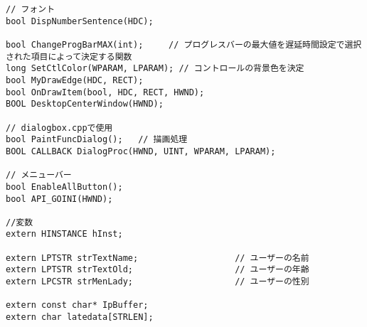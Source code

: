 \begin{lstlisting}[caption=main.h]
// フォント
bool DispNumberSentence(HDC);

bool ChangeProgBarMAX(int);     // プログレスバーの最大値を遅延時間設定で選択された項目によって決定する関数
long SetCtlColor(WPARAM, LPARAM); // コントロールの背景色を決定
bool MyDrawEdge(HDC, RECT);
bool OnDrawItem(bool, HDC, RECT, HWND);
BOOL DesktopCenterWindow(HWND);

// dialogbox.cppで使用
bool PaintFuncDialog();   // 描画処理
BOOL CALLBACK DialogProc(HWND, UINT, WPARAM, LPARAM);

// メニューバー
bool EnableAllButton();
bool API_GOINI(HWND);

//変数
extern HINSTANCE hInst;

extern LPTSTR strTextName;                   // ユーザーの名前
extern LPTSTR strTextOld;                    // ユーザーの年齢
extern LPCSTR strMenLady;                    // ユーザーの性別

extern const char* IpBuffer;
extern char latedata[STRLEN];
\end{lstlisting}

